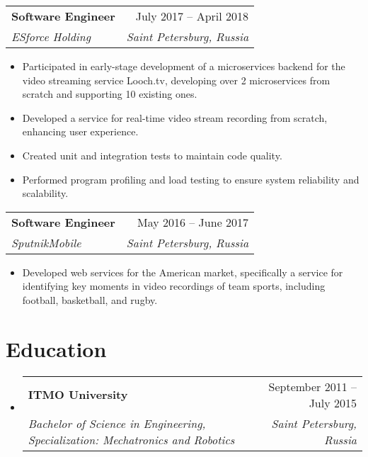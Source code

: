 \documentclass[letterpaper,11pt]{article}
\makeatletter
\newcommand{\resumeItem}[1]{
  \item\small{
    {#1 \vspace{-2pt}}
  }
}
\newcommand{\resumeSubheading}[4]{
  \vspace{-2pt}\item
    \begin{tabular*}{0.97\textwidth}[t]{l@{\extracolsep{\fill}}r}
      \textbf{#1} & #2 \\
      \textit{\small#3} & \textit{\small #4} \\
    \end{tabular*}\vspace{-7pt}
}
\newcommand{\resumeSubHeadingListStart}{\begin{itemize}[leftmargin=0.15in, label={}]}
\newcommand{\resumeSubHeadingListEnd}{\end{itemize}}
\newcommand{\resumeItemListStart}{\begin{itemize}}
\newcommand{\resumeItemListEnd}{\end{itemize}\vspace{-5pt}}
\makeatother
\begin{document}
  \resumeSubheading
      {Software Engineer}{July 2017 -- April 2018}
      {ESforce Holding}{Saint Petersburg, Russia}
      \resumeItemListStart
        \resumeItem{Participated in early-stage development of a microservices backend for the video streaming service Looch.tv, developing over 2 microservices from scratch and supporting 10 existing ones.}
        \resumeItem{Developed a service for real-time video stream recording from scratch, enhancing user experience.}
        \resumeItem{Created unit and integration tests to maintain code quality.}
        \resumeItem{Performed program profiling and load testing to ensure system reliability and scalability.}
      \resumeItemListEnd

  \resumeSubheading
      {Software Engineer}{May 2016 -- June 2017}
      {SputnikMobile}{Saint Petersburg, Russia}
      \resumeItemListStart
        \resumeItem{Developed web services for the American market, specifically a service for identifying key moments in video recordings of team sports, including football, basketball, and rugby.}
      \resumeItemListEnd




\section{Education}
  \resumeSubHeadingListStart
    \resumeSubheading
      {ITMO University}{September 2011 -- July 2015}
      {Bachelor of Science in Engineering, Specialization: Mechatronics and Robotics}{Saint Petersburg, Russia}
  \resumeSubHeadingListEnd
\end{document}
